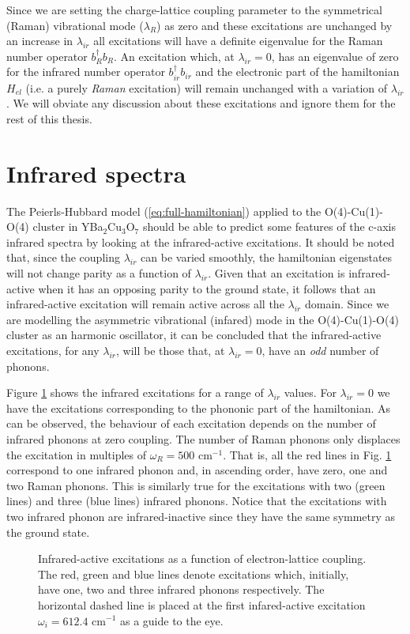 Since we are setting the charge-lattice coupling parameter to the symmetrical (Raman) vibrational mode ($\lambda_R$) as zero and these excitations are unchanged by an increase in $\lambda_{ir}$ all excitations will have a definite eigenvalue for the Raman number operator $b_R^\dagger b_R$. 
An excitation which, at $\lambda_{ir}=0$, has an eigenvalue of zero for the infrared number operator $b_{ir}^\dagger b_{ir}$ and the electronic part of the hamiltonian $H_{el}$ (i.e. a purely \textit{Raman} excitation) will remain unchanged with a variation of $\lambda_{ir}$.
We will obviate any discussion about these excitations and ignore them for the rest of this thesis. 


\section{Infrared spectra}
\label{sec:irSpectra}

The Peierls-Hubbard model (\ref{eq:full-hamiltonian}) applied to the O(4)-Cu(1)-O(4) cluster in YBa$_2$Cu$_3$O$_7$ should be able to predict some features of the c-axis infrared spectra by looking at the infrared-active excitations.
It should be noted that, since the coupling $\lambda_{ir}$ can be varied smoothly, the hamiltonian eigenstates will not change parity as a function of $\lambda_{ir}$.
Given that an excitation is infrared-active when it has an opposing parity to the ground state, it follows that an infrared-active excitation will remain active across all the $\lambda_{ir}$ domain.
Since we are modelling the asymmetric vibrational (infared) mode in the O(4)-Cu(1)-O(4) cluster as an harmonic oscillator, it can be concluded that the infrared-active excitations, for any $\lambda_{ir}$, will be those that, at $\lambda_{ir}=0$, have an \textit{odd} number of phonons.

Figure \ref{fig:irSpectra} shows the infrared excitations for a range of $\lambda_{ir}$ values.
For $\lambda_{ir}=0$ we have the excitations corresponding to the phononic part of the hamiltonian.
As can be observed, the behaviour of each excitation depends on the number of infrared phonons at zero coupling.
The number of Raman phonons only displaces the excitation in multiples of $\omega_R=500$ cm$^{-1}$.
That is, all the red lines in Fig. \ref{fig:irSpectra} correspond to one infrared phonon and, in ascending order, have zero, one and two Raman phonons.
This is similarly true for the excitations with two (green lines) and three (blue lines) infrared phonons.
Notice that the excitations with two infrared phonon are infrared-inactive since they have the same symmetry as the ground state.
%
\begin{figure}[ht]
  \centering
  
  \caption[Infrared-active excitations as a function of electron-lattice coupling.]
  {Infrared-active excitations as a function of electron-lattice coupling.
  The red, green and blue lines denote excitations which, initially, have one, two and three infrared phonons respectively.
  The horizontal dashed line is placed at the first infared-active excitation $\omega_i=612.4$ cm$^{-1}$ as a guide to the eye.}
  \label{fig:irSpectra}
\end{figure}

